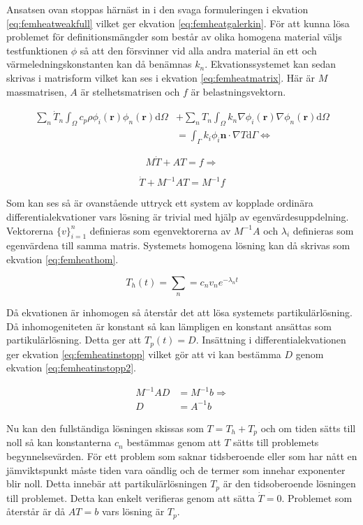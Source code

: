 \noindent
Ansatsen ovan stoppas härnäst in i den svaga formuleringen i ekvation
\eqref{eq:femheatweakfull} vilket ger ekvation \eqref{eq:femheatgalerkin}.
För att kunna lösa problemet för definitionsmängder som består av olika
homogena material väljs testfunktionen $\phi$ så att den försvinner vid
alla andra material än ett och värmeledningskonstanten kan då benämnas $k_n$.
Ekvationssystemet kan sedan skrivas i matrisform vilket kan ses i ekvation
\eqref{eq:femheatmatrix}. Här är $M$ massmatrisen, $A$ är stelhetsmatrisen och
$f$ är belastningsvektorn.

\begin{align}
\label{eq:femheatgalerkin}
\sum_n \dot{T}_n \int_\Omega c_p\rho\phi_i(\mathbf{r})
\phi_n(\mathbf{r})\mathrm{d}\Omega
& + \sum_n T_n \int_\Omega k_n \nabla\phi_i(\mathbf{r})\nabla\phi_n(\mathbf{r})
\mathrm{d}\Omega \\
&= \int_\Gamma k_i\phi_i\mathbf{n}\cdot\nabla T\mathrm{d}\Gamma \Leftrightarrow
\nonumber
\end{align}

\begin{equation}
\label{eq:femheatmatrix}
M\dot{T} + AT = f \Rightarrow
\end{equation}

\begin{equation}
\label{eq:femheatmatrix2}
\dot{T} + M^{-1}AT = M^{-1}f
\end{equation}

\noindent
Som kan ses så är ovanstående uttryck ett system av kopplade ordinära
differentialekvationer vars lösning är trivial med hjälp av egenvärdesuppdelning.
Vektorerna $\{v\}^n_{i=1}$ definieras som egenvektorerna av
$M^{-1}A$ och $\lambda_i$ definieras som egenvärdena till samma matris.
Systemets homogena lösning kan då skrivas som ekvation
\eqref{eq:femheathom}.\cite{lay06}

\begin{equation}
\label{eq:femheathom}
T_h(t) = \sum_n = c_nv_ne^{-\lambda_nt}
\end{equation}

\noindent
Då ekvationen är inhomogen så återstår det att lösa systemets
partikulärlösning. Då inhomogeniteten är konstant så kan lämpligen
en konstant ansättas som partikulärlösning. Detta ger att
$T_p(t) = D$. Insättning i differentialekvationen ger
ekvation \eqref{eq:femheatinstopp} vilket gör att vi kan bestämma
$D$ genom ekvation \eqref{eq:femheatinstopp2}.

\begin{align}
\label{eq:femheatinstopp}
M^{-1}AD &= M^{-1}b \Rightarrow\\
\label{eq:femheatinstopp2}
D &= A^{-1}b
\end{align}

\noindent
Nu kan den fullständiga lösningen skissas som $T = T_h + T_p$ och om
tiden sätts till noll så kan konstanterna $c_n$ bestämmas genom
att $T$ sätts till problemets begynnelsevärden. För ett problem som
saknar tidsberoende eller som har nått en jämviktspunkt måste
tiden vara oändlig och de termer som innehar exponenter blir noll.
Detta innebär att partikulärlösningen $T_p$ är den tidsoberoende lösningen
till problemet. Detta kan enkelt verifieras genom att sätta $\dot{T} = 0$.
Problemet som återstår är då $AT = b$ vars lösning är $T_p$.
